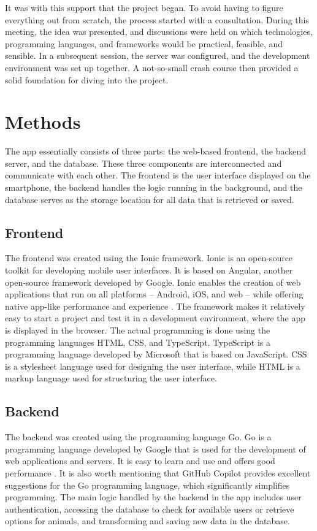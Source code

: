 \documentclass{josis}
\begin{document}
It was with this support that the project began. To avoid having to figure everything out from scratch, 
the process started with a consultation. During this meeting, the idea was presented, 
and discussions were held on which technologies, programming languages, 
and frameworks would be practical, feasible, and sensible. 
In a subsequent session, the server was configured, and the development environment was set up together. 
A not-so-small crash course then provided a solid foundation for diving into the project.

\section{Methods}

The app essentially consists of three parts: the web-based frontend, the backend server, 
and the database. These three components are interconnected and communicate with each other. 
The frontend is the user interface displayed on the smartphone, 
the backend handles the logic running in the background, 
and the database serves as the storage location for all data that is retrieved or saved.

\subsection{Frontend}

The frontend was created using the Ionic framework. Ionic is an open-source toolkit for 
developing mobile user interfaces. It is based on Angular, another open-source framework developed by Google. 
Ionic enables the creation of web applications that run on all platforms -- Android, iOS, and web -- while 
offering native app-like performance and experience \cite{IonicFrameworkCrossPlatform}.
The framework makes it relatively easy to start a project and test it in a development environment, 
where the app is displayed in the browser. The actual programming is done using the programming 
languages HTML, CSS, and TypeScript. TypeScript is a programming language developed by Microsoft that is based on JavaScript. 
CSS is a stylesheet language used for designing the user interface, while HTML is a markup language used for structuring the user interface.

\subsection{Backend}

The backend was created using the programming language Go. Go is a programming language developed 
by Google that is used for the development of web applications and servers. 
It is easy to learn and use and offers good performance \cite{GoProgrammingLanguage}.
It is also worth mentioning that GitHub Copilot provides excellent suggestions for 
the Go programming language, which significantly simplifies programming. The main logic handled 
by the backend in the app includes user authentication, accessing the database to check for available 
users or retrieve options for animals, and transforming and saving new data in the database.
\end{document}
